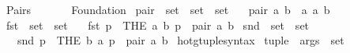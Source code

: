 %
\begin{isabellebody}%
%
%
\isadelimdocument
%
\endisadelimdocument
%
\isatagdocument
\isanewline
\isanewline
%
\isamarkuptrue%
%
\endisatagdocument
{\isafolddocument}%
%
\isadelimdocument
%
\endisadelimdocument
%
\isadelimtheory
%
\endisadelimtheory
%
\isatagtheory
{}\isamarkupfalse%
\ Pairs\isanewline
\ \ \isanewline
\ \ \ \ Foundation\isanewline
{}%
\endisatagtheory
{\isafoldtheory}%
%
\isadelimtheory
\isanewline
%
\endisadelimtheory
\isanewline
{}\isamarkupfalse%
\ pair\ {\isacharcolon}{\kern0pt}{\isacharcolon}{\kern0pt}\ {\isacartoucheopen}set\ {\isasymRightarrow}\ set\ {\isasymRightarrow}\ set{\isacartoucheclose}\isanewline
\ \ \ {\isachardoublequoteopen}pair\ a\ b\ {\isasymequiv}\ {\isacharbraceleft}{\kern0pt}{\isacharbraceleft}{\kern0pt}a{\isacharbraceright}{\kern0pt}{\isacharcomma}{\kern0pt}\ {\isacharbraceleft}{\kern0pt}a{\isacharcomma}{\kern0pt}\ b{\isacharbraceright}{\kern0pt}{\isacharbraceright}{\kern0pt}{\isachardoublequoteclose}\isanewline
\isanewline
{}\isamarkupfalse%
\ fst\ {\isacharcolon}{\kern0pt}{\isacharcolon}{\kern0pt}\ {\isacartoucheopen}set\ {\isasymRightarrow}\ set{\isacartoucheclose}\isanewline
\ \ \ {\isachardoublequoteopen}fst\ p\ {\isasymequiv}\ THE\ a{\isachardot}{\kern0pt}\ {\isasymexists}b{\isachardot}{\kern0pt}\ p\ {\isacharequal}{\kern0pt}\ pair\ a\ b{\isachardoublequoteclose}\isanewline
\isanewline
{}\isamarkupfalse%
\ snd\ {\isacharcolon}{\kern0pt}{\isacharcolon}{\kern0pt}\ {\isacartoucheopen}set\ {\isasymRightarrow}\ set{\isacartoucheclose}\isanewline
\ \ \ {\isachardoublequoteopen}snd\ p\ {\isasymequiv}\ THE\ b{\isachardot}{\kern0pt}\ {\isasymexists}a{\isachardot}{\kern0pt}\ p\ {\isacharequal}{\kern0pt}\ pair\ a\ b{\isachardoublequoteclose}\isanewline
\isanewline
{}\isamarkupfalse%
\ hotg{\isacharunderscore}{\kern0pt}tuple{\isacharunderscore}{\kern0pt}syntax\isanewline
{}\isanewline
{}\isamarkupfalse%
\ {\isachardoublequoteopen}{\isacharunderscore}{\kern0pt}tuple{\isachardoublequoteclose}\ {\isacharcolon}{\kern0pt}{\isacharcolon}{\kern0pt}\ {\isacartoucheopen}args\ {\isasymRightarrow}\ set{\isacartoucheclose}\ {\isacharparenleft}{\kern0pt}{\isachardoublequoteopen}{\isasymlangle}{\isacharunderscore}{\kern0pt}{\isasymrangle}{\isachardoublequoteclose}{\isacharparenright}{\kern0pt}\isanewline

\end{isabellebody}
